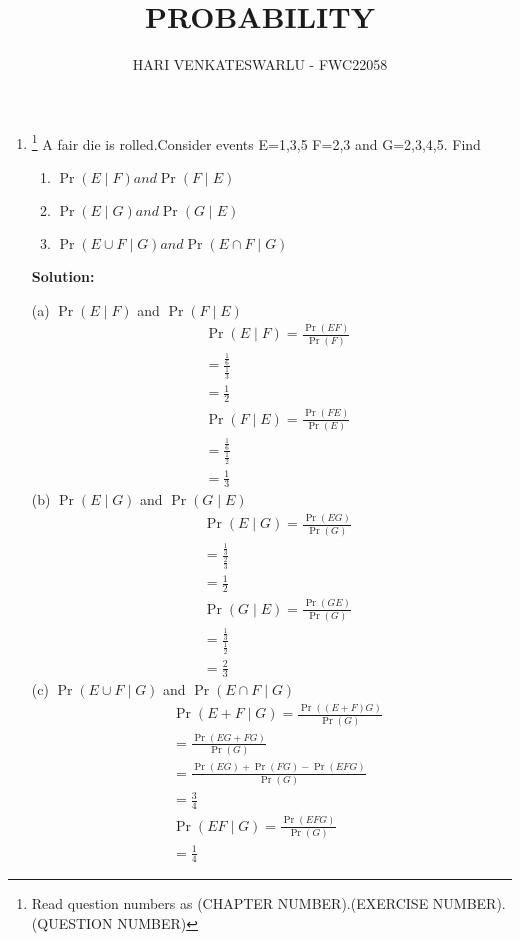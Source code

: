 \documentclass{article}
\providecommand{\pr}[1]{\ensuremath{\Pr\left(#1\right)}}
\newcommand{\solution}{\noindent \textbf{Solution: }}
\providecommand{\pr}[1]{\ensuremath{\Pr\left(#1\right)}}
\begin{document}
\title{PROBABILITY}
\author{\Large HARI VENKATESWARLU - FWC22058}
\date{}

\maketitle

\begin{enumerate}[label=13.\arabic{enumi}.\arabic{enumii}]%
\setcounter{enumi}{0}
\setcounter{enumii}{11}

\item \footnote{Read question numbers as (CHAPTER NUMBER).(EXERCISE NUMBER).(QUESTION NUMBER)} {A fair die is rolled.Consider events E=1,3,5 F=2,3 and G=2,3,4,5. Find}
\begin{enumerate}
\item $\pr{E \mid F} and \pr{F \mid E}$
\item $\pr{E \mid G} and \pr{G \mid E}$
\item $\pr{{E \cup F} \mid G} and \pr{{E \cap F} \mid G}$
\end{enumerate}
	\solution\\
	\begin{table}[h]\centering
	
	\caption{}\label{table1:}
\end{table}

(a) $\pr{E \mid F}$ and $\pr{F \mid E}$
\begin{align}
&\pr{E \mid F} = \frac{\pr{EF}}{\pr{F}}\\
&=\frac{\frac{1}{6}}{\frac{1}{3}}\\
&=\frac{1}{2}\\
&\pr{F \mid E} = \frac{\pr{FE}}{\pr{E}}\\
&= \frac{\frac{1}{6}}{\frac{1}{2}}\\
&=\frac{1}{3}
\end{align}
(b) $\pr{E \mid G}$ and $\pr{G \mid E}$
\begin{align}
&\pr{E \mid G} = \frac{\pr{EG}}{\pr{G}}\\
&=\frac{\frac{1}{3}}{\frac{2}{3}}\\
&=\frac{1}{2}\\
&\pr{G \mid E} = \frac{\pr{GE}}{\pr{G}}\\
&=\frac{\frac{1}{3}}{\frac{1}{2}}\\
&=\frac{2}{3}
\end{align}
(c) $\pr{{E \cup F} \mid G}$ and $\pr{{E \cap F} \mid G}$
\begin{align}
&\pr{{E+F} \mid G} = \frac{\pr{{(E+F)}G}}{\pr{G}}\\
&=\frac{\pr{{EG+F}G}}{\pr{G}}\\
&=\frac{\pr{EG}+\pr{FG}-\pr{EFG}}{\pr{G}}\\
&=\frac{3}{4}\\
&\pr{{EF} \mid G} = \frac{\pr{EFG}}{\pr{G}}\\
&=\frac{1}{4}
\end{align}
\end{enumerate}
\end{document}
